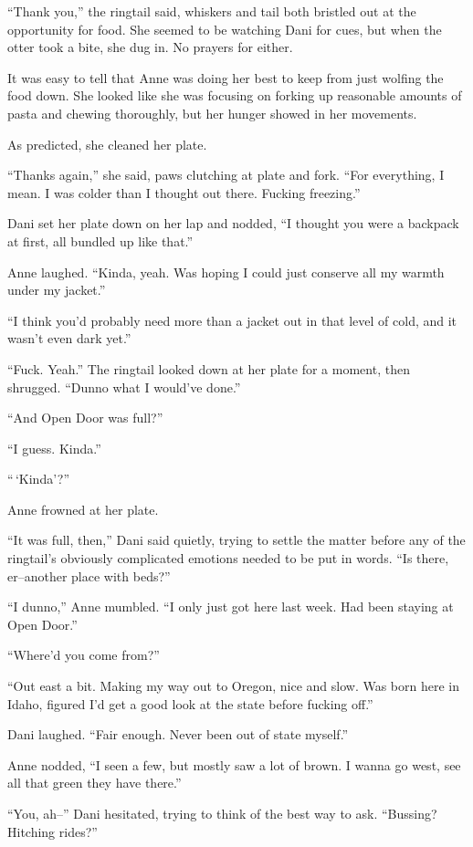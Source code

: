 ``Thank you,'' the ringtail said, whiskers and tail both bristled out at the opportunity for food. She seemed to be watching Dani for cues, but when the otter took a bite, she dug in. No prayers for either.

It was easy to tell that Anne was doing her best to keep from just wolfing the food down. She looked like she was focusing on forking up reasonable amounts of pasta and chewing thoroughly, but her hunger showed in her movements.

As predicted, she cleaned her plate.

``Thanks again,'' she said, paws clutching at plate and fork. ``For everything, I mean. I was colder than I thought out there. Fucking freezing.''

Dani set her plate down on her lap and nodded, ``I thought you were a backpack at first, all bundled up like that.''

Anne laughed. ``Kinda, yeah. Was hoping I could just conserve all my warmth under my jacket.''

``I think you'd probably need more than a jacket out in that level of cold, and it wasn't even dark yet.''

``Fuck. Yeah.'' The ringtail looked down at her plate for a moment, then shrugged. ``Dunno what I would've done.''

``And Open Door was full?''

``I guess. Kinda.''

``\,`Kinda'?''

Anne frowned at her plate.

``It was full, then,'' Dani said quietly, trying to settle the matter before any of the ringtail's obviously complicated emotions needed to be put in words. ``Is there, er--another place with beds?''

``I dunno,'' Anne mumbled. ``I only just got here last week. Had been staying at Open Door.''

``Where'd you come from?''

``Out east a bit. Making my way out to Oregon, nice and slow. Was born here in Idaho, figured I'd get a good look at the state before fucking off.''

Dani laughed. ``Fair enough. Never been out of state myself.''

Anne nodded, ``I seen a few, but mostly saw a lot of brown. I wanna go west, see all that green they have there.''

``You, ah--'' Dani hesitated, trying to think of the best way to ask. ``Bussing? Hitching rides?''

